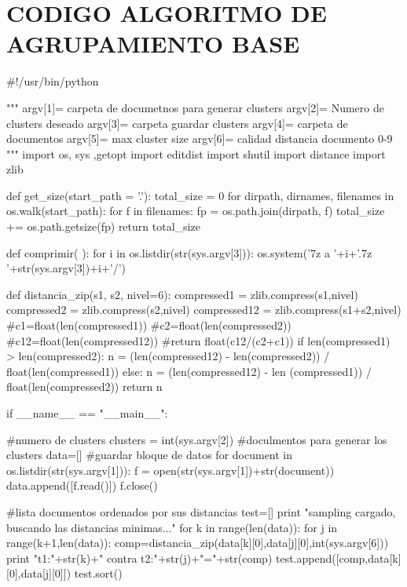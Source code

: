 


\chapter{CODIGO ALGORITMO DE AGRUPAMIENTO BASE}
\label{ch:Codigo Metodo de agrupación propuesto}



\begin{python}







#!/usr/bin/python

""" argv[1]= carpeta de documetnos para generar clusters
	argv[2]= Numero de clusters deseado
	argv[3]= carpeta guardar clusters
	argv[4]= carpeta de documentos
	argv[5]= max cluster size
	argv[6]= calidad distancia documento 0-9
"""
import os, sys ,getopt
import editdist
import shutil
import distance
import zlib


def get_size(start_path = '.'):
    total_size = 0
    for dirpath, dirnames, filenames in os.walk(start_path):
        for f in filenames:
            fp = os.path.join(dirpath, f)
            total_size += os.path.getsize(fp)
    return total_size

def comprimir( ):
	for i in os.listdir(str(sys.argv[3])):
		os.system('7z a '+i+'.7z '+str(sys.argv[3])+i+'/')
	
def distancia_zip(s1, s2, nivel=6):
	compressed1 = zlib.compress(s1,nivel)
	compressed2 = zlib.compress(s2,nivel)
	compressed12 = zlib.compress(s1+s2,nivel)
	#c1=float(len(compressed1))
	#c2=float(len(compressed2))
	#c12=float(len(compressed12))
	#return float(c12/(c2+c1))
	if len(compressed1) > len(compressed2):
		n = (len(compressed12) - len(compressed2)) / float(len(compressed1))
	else:
		n = (len(compressed12) - len (compressed1)) / float(len(compressed2))	
	return n

		
    
if __name__ == "__main__":
	
	#numero de clusters
	clusters = int(sys.argv[2])
	#doculmentos para generar los clusters
	data=[]  
	#guardar bloque de datos 
	for document in os.listdir(str(sys.argv[1])):
		f = open(str(sys.argv[1])+str(document))
		data.append([f.read()])
		f.close()


	#lista documentos ordenados por sus distancias 
	test=[]
	print "sampling cargado, buscando las distancias minimas..."
	for k in range(len(data)):
			for j in range(k+1,len(data)):
				comp=distancia_zip(data[k][0],data[j][0],int(sys.argv[6]))
				print "t1:"+str(k)+" contra t2:"+str(j)+"="+str(comp)
				test.append([comp,data[k][0],data[j][0]])          
	test.sort()
	

\end{python}
